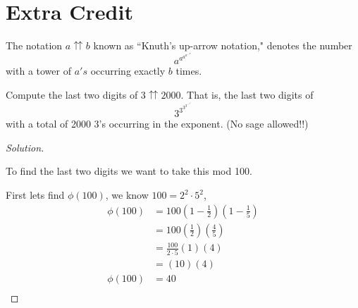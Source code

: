 \documentclass[11pt]{article}
\newenvironment{myproblem}[1][Problem]{\begin{trivlist}
    \item[\hskip \labelsep {\bfseries #1.}]}{\end{trivlist}}
\newenvironment{solution}
  {\renewcommand\qedsymbol{$~$}\begin{proof}[Solution]$ $\par\nobreak\ignorespaces}
  {\end{proof}}
\begin{document}
\section{Extra Credit}
\begin{myproblem}
    The notation $a\upuparrows b$ known as ``Knuth's up-arrow notation," denotes the number
    \[
        a^{a^{a^{a^{{...}^{a^{a}}}}}}
    \]
    with a tower of $a's$ occurring exactly $b$ times.

    Compute the last two digits of $3\upuparrows 2000$. That is, the last two digits of
    \[
        3^{3^{3^{3^{{...}^{3^{3}}}}}}
    \]
    with a total of 2000 3's occurring in the exponent. (No sage allowed!!)
\end{myproblem}

\begin{solution}
    To find the last two digits we want to take this mod 100.

    First lets find $\phi(100)$, we know $100=2^2\cdot 5^2$,
    \begin{align*}
        \phi(100) & = 100 \left(1-\frac{1}{2}\right)\left(1-\frac{1}{5}\right) \\
                  & = 100 \left(\frac{1}{2}\right)\left(\frac{4}{5}\right)     \\
                  & = \frac{100}{2\cdot 5} (1)(4)                              \\
                  & = (10)(4)                                                  \\
        \phi(100) & = 40                                                       \\
    \end{align*}


\end{solution}
\end{document}
